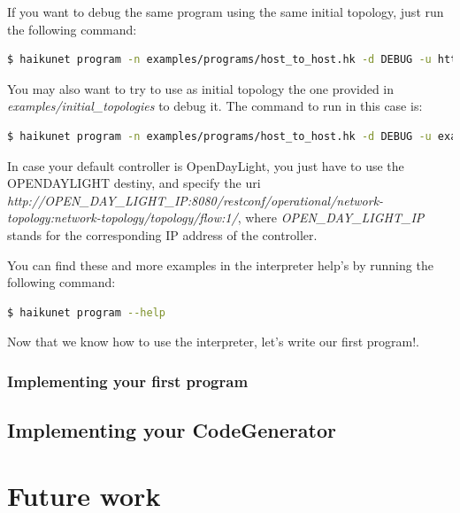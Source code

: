 If you want to debug the same program using the same initial topology, just run the following command:

\begin{lstlisting}[language=bash,breaklines=true]
$ haikunet program -n examples/programs/host_to_host.hk -d DEBUG -u http://127.0.0.1:8181/onos/v1/
\end{lstlisting}

You may also want to try to use as initial topology the one provided in \textit{examples/initial\_topologies} to debug it. The command to run in this case is:

\begin{lstlisting}[language=bash,breaklines=true]
$ haikunet program -n examples/programs/host_to_host.hk -d DEBUG -u examples/initial_topologies/example_topology.rb
\end{lstlisting}

In case your default controller is OpenDayLight, you just have to use the OPENDAYLIGHT destiny, and specify the uri \textit{http://OPEN\_DAY\_LIGHT\_IP:8080/restconf/operational/network-topology:network-topology/topology/flow:1/}, where \textit{OPEN\_DAY\_LIGHT\_IP} stands for the corresponding IP address of the controller. 

You can find these and more examples in the interpreter help's by running the following command:

\begin{lstlisting}[language=bash,breaklines=true]
$ haikunet program --help
\end{lstlisting}

Now that we know how to use the interpreter, let's write our first program!.

\subsubsection{Implementing your first program}

\subsection{Implementing your CodeGenerator}

\section{Future work}